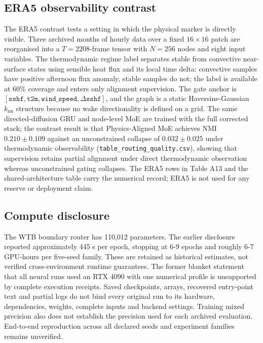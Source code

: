\documentclass[
  journal]{IEEEtran}
\begin{document}
\FloatBarrier

\subsection*{ERA5 observability
contrast}\label{era5-observability-contrast}

The ERA5 contrast tests a setting in which the physical marker is
directly visible. Three archived months of hourly data over a fixed
\(16\times16\) patch are reorganised into a \(T{=}2208\)-frame tensor
with \(N{=}256\) nodes and eight input variables. The thermodynamic
regime label separates stable from convective near-surface states using
sensible heat flux and its local time delta: convective samples have
positive afternoon flux anomaly, stable samples do not; the label is
available at 60\% coverage and enters only alignment supervision. The
gate anchor is
\([\texttt{sshf}, \texttt{t2m}, \texttt{wind\_speed}, \Delta\texttt{sshf}]\),
and the graph is a static Haversine-Gaussian \(k_{\mathrm{nn}}\)
structure because no wake directionality is defined on a grid. The same
directed-diffusion GRU and node-level MoE are trained with the full
corrected stack; the contrast result is that Physics-Aligned MoE
achieves NMI \(0.210 \pm 0.109\) against an unconstrained collapse of
\(0.032 \pm 0.025\) under thermodynamic observability
(\texttt{table\_routing\_quality.csv}), showing that supervision retains
partial alignment under direct thermodynamic observation whereas
unconstrained gating collapses. The ERA5 rows in Table A13 and the
shared-architecture table carry the numerical record; ERA5 is not used
for any reserve or deployment claim.

\FloatBarrier

\subsection*{Compute disclosure}\label{compute-disclosure}

The WTB boundary router has 110,012 parameters. The earlier disclosure
reported approximately 445 s per epoch, stopping at 6-9 epochs and
roughly 6-7 GPU-hours per five-seed family. These are retained as
historical estimates, not verified cross-environment runtime guarantees.
The former blanket statement that all neural runs used an RTX 4090 with
one numerical profile is unsupported by complete execution receipts.
Saved checkpoints, arrays, recovered entry-point text and partial logs
do not bind every original run to its hardware, dependencies, weights,
complete inputs and backend settings. Training mixed precision also does
not establish the precision used for each archived evaluation.
End-to-end reproduction across all declared seeds and experiment
families remains unverified.
\end{document}
